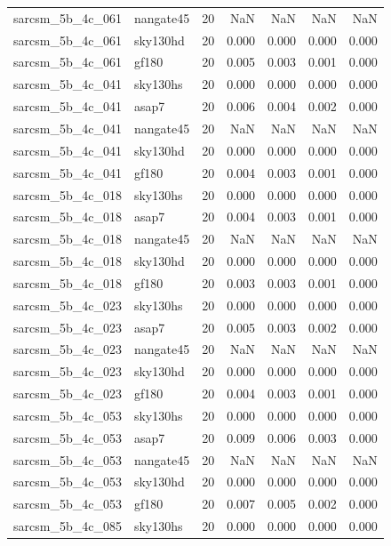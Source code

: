 \begin{tabular}{llrrrrr}
sarcsm\_5b\_4c\_061 & nangate45 & 20 & NaN & NaN & NaN & NaN \\
sarcsm\_5b\_4c\_061 & sky130hd & 20 & 0.000 & 0.000 & 0.000 & 0.000 \\
sarcsm\_5b\_4c\_061 & gf180 & 20 & 0.005 & 0.003 & 0.001 & 0.000 \\
sarcsm\_5b\_4c\_041 & sky130hs & 20 & 0.000 & 0.000 & 0.000 & 0.000 \\
sarcsm\_5b\_4c\_041 & asap7 & 20 & 0.006 & 0.004 & 0.002 & 0.000 \\
sarcsm\_5b\_4c\_041 & nangate45 & 20 & NaN & NaN & NaN & NaN \\
sarcsm\_5b\_4c\_041 & sky130hd & 20 & 0.000 & 0.000 & 0.000 & 0.000 \\
sarcsm\_5b\_4c\_041 & gf180 & 20 & 0.004 & 0.003 & 0.001 & 0.000 \\
sarcsm\_5b\_4c\_018 & sky130hs & 20 & 0.000 & 0.000 & 0.000 & 0.000 \\
sarcsm\_5b\_4c\_018 & asap7 & 20 & 0.004 & 0.003 & 0.001 & 0.000 \\
sarcsm\_5b\_4c\_018 & nangate45 & 20 & NaN & NaN & NaN & NaN \\
sarcsm\_5b\_4c\_018 & sky130hd & 20 & 0.000 & 0.000 & 0.000 & 0.000 \\
sarcsm\_5b\_4c\_018 & gf180 & 20 & 0.003 & 0.003 & 0.001 & 0.000 \\
sarcsm\_5b\_4c\_023 & sky130hs & 20 & 0.000 & 0.000 & 0.000 & 0.000 \\
sarcsm\_5b\_4c\_023 & asap7 & 20 & 0.005 & 0.003 & 0.002 & 0.000 \\
sarcsm\_5b\_4c\_023 & nangate45 & 20 & NaN & NaN & NaN & NaN \\
sarcsm\_5b\_4c\_023 & sky130hd & 20 & 0.000 & 0.000 & 0.000 & 0.000 \\
sarcsm\_5b\_4c\_023 & gf180 & 20 & 0.004 & 0.003 & 0.001 & 0.000 \\
sarcsm\_5b\_4c\_053 & sky130hs & 20 & 0.000 & 0.000 & 0.000 & 0.000 \\
sarcsm\_5b\_4c\_053 & asap7 & 20 & 0.009 & 0.006 & 0.003 & 0.000 \\
sarcsm\_5b\_4c\_053 & nangate45 & 20 & NaN & NaN & NaN & NaN \\
sarcsm\_5b\_4c\_053 & sky130hd & 20 & 0.000 & 0.000 & 0.000 & 0.000 \\
sarcsm\_5b\_4c\_053 & gf180 & 20 & 0.007 & 0.005 & 0.002 & 0.000 \\
sarcsm\_5b\_4c\_085 & sky130hs & 20 & 0.000 & 0.000 & 0.000 & 0.000 \\

\end{tabular}
